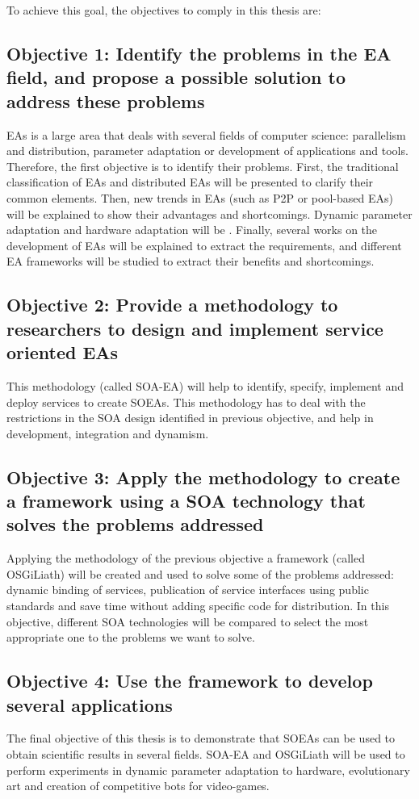 To achieve this goal, the objectives to comply in this thesis are:

\subsection{Objective 1: Identify the problems in the EA field, and propose a possible solution to address these problems}
\label{subsec:intro:obj:problems}
EAs is a large area that deals with several fields of computer science: parallelism and distribution, parameter adaptation or development of applications and tools. Therefore, the first objective is to identify their problems. First, the traditional classification of EAs and distributed EAs will be presented to clarify their common elements. Then, new trends in EAs (such as P2P or pool-based EAs) will be explained to show their advantages and shortcomings. Dynamic parameter adaptation and hardware adaptation will be . Finally, several works on the development of EAs will be explained to extract the requirements, and different EA frameworks will be studied to extract their benefits and shortcomings.

\subsection{Objective 2: Provide a methodology to researchers to design and implement service oriented EAs} 
\label{subsec:intro:obj:methodology}
This methodology (called SOA-EA) will help to identify, specify, implement and deploy services to create SOEAs. This methodology has to deal with the restrictions in the SOA design identified in previous objective, and help in development, integration and dynamism.

\subsection{Objective 3: Apply the methodology to create a framework using a SOA technology that solves the problems addressed}
\label{subsec:intro:obj:fwork}
Applying the methodology of the previous objective a framework (called OSGiLiath) will be created and used to solve some of the problems addressed: dynamic binding of services, publication of service interfaces using public standards and save time without adding specific code for distribution. In this objective, different SOA technologies will be compared to select the most appropriate one to the problems we want to solve.

\subsection{Objective 4: Use the framework to develop several applications}
\label{subsec:intro:obj:applications}
The final objective of this thesis is to demonstrate that SOEAs can be used to obtain scientific results in several fields. SOA-EA and OSGiLiath will be used to perform experiments in dynamic parameter adaptation to hardware, evolutionary art and creation of competitive bots for video-games.



